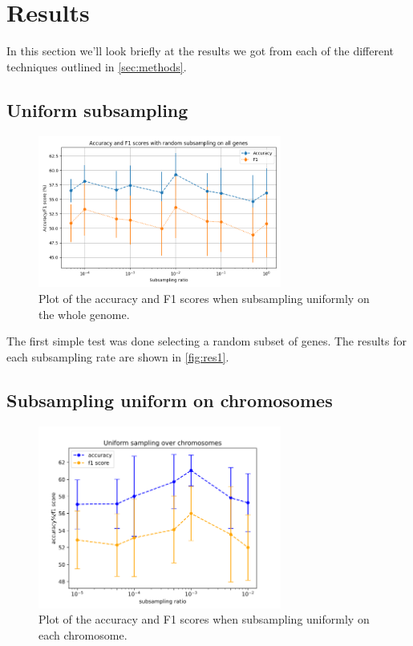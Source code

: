 \section{Results}
\label{sec:results}
In this section we'll look briefly at the results we got from each of the different techniques outlined in \autoref{sec:methods}.

\subsection{Uniform subsampling}
\begin{figure}[ht]
    \begin{center}
\includegraphics[width=8cm]{figures/subsample_plot.png}
    \end{center}
\caption{Plot of the accuracy and F1 scores when subsampling uniformly on the whole genome.}
\label{fig:res1}
\end{figure}

The first simple test was done selecting a random subset of genes. The results for each subsampling rate are shown in \autoref{fig:res1}.




\subsection{Subsampling uniform on chromosomes}
\begin{figure}[ht]
    \begin{center}
\includegraphics[width=8cm]{figures/uniform_sample_low_ratio.png}
% 
    \end{center}
\caption{Plot of the accuracy and F1 scores when subsampling uniformly on each chromosome.}
\label{fig:res2}
\end{figure}


